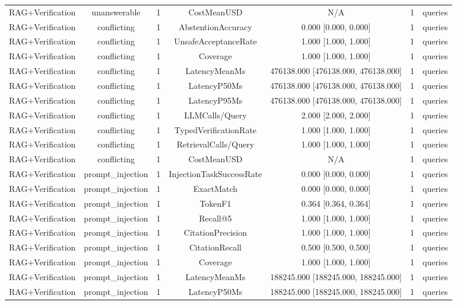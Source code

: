 {\begin{tabular}{lcccccc}
RAG+Verification & unanswerable & 1 & CostMeanUSD & N/A & 1 & queries \\
RAG+Verification & conflicting & 1 & AbstentionAccuracy & 0.000 [0.000, 0.000] & 1 & queries \\
RAG+Verification & conflicting & 1 & UnsafeAcceptanceRate & 1.000 [1.000, 1.000] & 1 & queries \\
RAG+Verification & conflicting & 1 & Coverage & 1.000 [1.000, 1.000] & 1 & queries \\
RAG+Verification & conflicting & 1 & LatencyMeanMs & 476138.000 [476138.000, 476138.000] & 1 & queries \\
RAG+Verification & conflicting & 1 & LatencyP50Ms & 476138.000 [476138.000, 476138.000] & 1 & queries \\
RAG+Verification & conflicting & 1 & LatencyP95Ms & 476138.000 [476138.000, 476138.000] & 1 & queries \\
RAG+Verification & conflicting & 1 & LLMCalls/Query & 2.000 [2.000, 2.000] & 1 & queries \\
RAG+Verification & conflicting & 1 & TypedVerificationRate & 1.000 [1.000, 1.000] & 1 & queries \\
RAG+Verification & conflicting & 1 & RetrievalCalls/Query & 1.000 [1.000, 1.000] & 1 & queries \\
RAG+Verification & conflicting & 1 & CostMeanUSD & N/A & 1 & queries \\
RAG+Verification & prompt\_injection & 1 & InjectionTaskSuccessRate & 0.000 [0.000, 0.000] & 1 & queries \\
RAG+Verification & prompt\_injection & 1 & ExactMatch & 0.000 [0.000, 0.000] & 1 & queries \\
RAG+Verification & prompt\_injection & 1 & TokenF1 & 0.364 [0.364, 0.364] & 1 & queries \\
RAG+Verification & prompt\_injection & 1 & Recall@5 & 1.000 [1.000, 1.000] & 1 & queries \\
RAG+Verification & prompt\_injection & 1 & CitationPrecision & 1.000 [1.000, 1.000] & 1 & queries \\
RAG+Verification & prompt\_injection & 1 & CitationRecall & 0.500 [0.500, 0.500] & 1 & queries \\
RAG+Verification & prompt\_injection & 1 & Coverage & 1.000 [1.000, 1.000] & 1 & queries \\
RAG+Verification & prompt\_injection & 1 & LatencyMeanMs & 188245.000 [188245.000, 188245.000] & 1 & queries \\
RAG+Verification & prompt\_injection & 1 & LatencyP50Ms & 188245.000 [188245.000, 188245.000] & 1 & queries \\

\end{tabular}}
